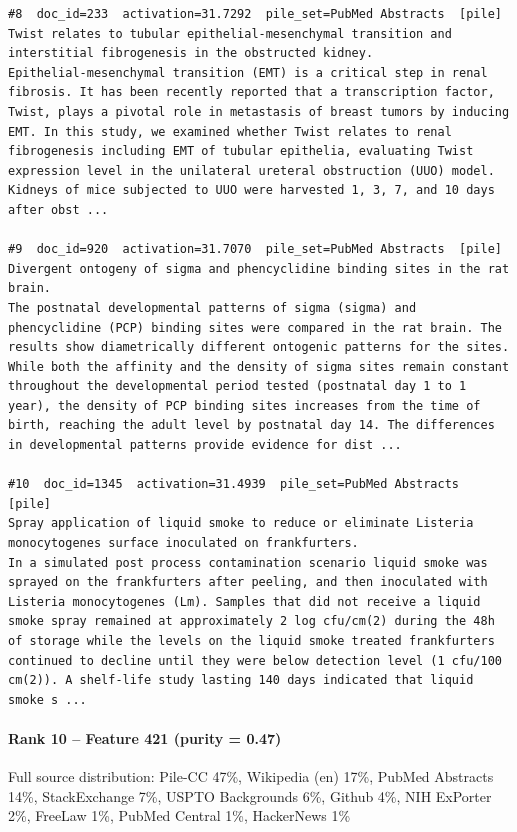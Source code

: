\begin{verbatim}
#8  doc_id=233  activation=31.7292  pile_set=PubMed Abstracts  [pile]
Twist relates to tubular epithelial-mesenchymal transition and interstitial fibrogenesis in the obstructed kidney.
Epithelial-mesenchymal transition (EMT) is a critical step in renal fibrosis. It has been recently reported that a transcription factor, Twist, plays a pivotal role in metastasis of breast tumors by inducing EMT. In this study, we examined whether Twist relates to renal fibrogenesis including EMT of tubular epithelia, evaluating Twist expression level in the unilateral ureteral obstruction (UUO) model. Kidneys of mice subjected to UUO were harvested 1, 3, 7, and 10 days after obst ...

#9  doc_id=920  activation=31.7070  pile_set=PubMed Abstracts  [pile]
Divergent ontogeny of sigma and phencyclidine binding sites in the rat brain.
The postnatal developmental patterns of sigma (sigma) and phencyclidine (PCP) binding sites were compared in the rat brain. The results show diametrically different ontogenic patterns for the sites. While both the affinity and the density of sigma sites remain constant throughout the developmental period tested (postnatal day 1 to 1 year), the density of PCP binding sites increases from the time of birth, reaching the adult level by postnatal day 14. The differences in developmental patterns provide evidence for dist ...

#10  doc_id=1345  activation=31.4939  pile_set=PubMed Abstracts  [pile]
Spray application of liquid smoke to reduce or eliminate Listeria monocytogenes surface inoculated on frankfurters.
In a simulated post process contamination scenario liquid smoke was sprayed on the frankfurters after peeling, and then inoculated with Listeria monocytogenes (Lm). Samples that did not receive a liquid smoke spray remained at approximately 2 log cfu/cm(2) during the 48h of storage while the levels on the liquid smoke treated frankfurters continued to decline until they were below detection level (1 cfu/100 cm(2)). A shelf-life study lasting 140 days indicated that liquid smoke s ...

\end{verbatim}

\paragraph*{Rank 10 -- Feature 421 (purity = 0.47)}

Full source distribution: Pile-CC 47\%, Wikipedia (en) 17\%, PubMed Abstracts 14\%, StackExchange 7\%, USPTO Backgrounds 6\%, Github 4\%, NIH ExPorter 2\%, FreeLaw 1\%, PubMed Central 1\%, HackerNews 1\%

